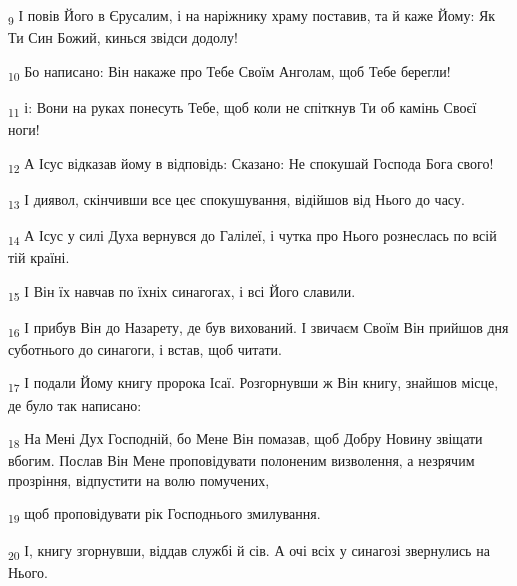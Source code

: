 \begin{tcolorbox}
\textsubscript{9} І повів Його в Єрусалим, і на наріжнику храму поставив, та й каже Йому: Як Ти Син Божий, кинься звідси додолу!
\end{tcolorbox}
\begin{tcolorbox}
\textsubscript{10} Бо написано: Він накаже про Тебе Своїм Анголам, щоб Тебе берегли!
\end{tcolorbox}
\begin{tcolorbox}
\textsubscript{11} і: Вони на руках понесуть Тебе, щоб коли не спіткнув Ти об камінь Своєї ноги!
\end{tcolorbox}
\begin{tcolorbox}
\textsubscript{12} А Ісус відказав йому в відповідь: Сказано: Не спокушай Господа Бога свого!
\end{tcolorbox}
\begin{tcolorbox}
\textsubscript{13} І диявол, скінчивши все цеє спокушування, відійшов від Нього до часу.
\end{tcolorbox}
\begin{tcolorbox}
\textsubscript{14} А Ісус у силі Духа вернувся до Галілеї, і чутка про Нього рознеслась по всій тій країні.
\end{tcolorbox}
\begin{tcolorbox}
\textsubscript{15} І Він їх навчав по їхніх синагогах, і всі Його славили.
\end{tcolorbox}
\begin{tcolorbox}
\textsubscript{16} І прибув Він до Назарету, де був вихований. І звичаєм Своїм Він прийшов дня суботнього до синагоги, і встав, щоб читати.
\end{tcolorbox}
\begin{tcolorbox}
\textsubscript{17} І подали Йому книгу пророка Ісаї. Розгорнувши ж Він книгу, знайшов місце, де було так написано:
\end{tcolorbox}
\begin{tcolorbox}
\textsubscript{18} На Мені Дух Господній, бо Мене Він помазав, щоб Добру Новину звіщати вбогим. Послав Він Мене проповідувати полоненим визволення, а незрячим прозріння, відпустити на волю помучених,
\end{tcolorbox}
\begin{tcolorbox}
\textsubscript{19} щоб проповідувати рік Господнього змилування.
\end{tcolorbox}
\begin{tcolorbox}
\textsubscript{20} І, книгу згорнувши, віддав службі й сів. А очі всіх у синагозі звернулись на Нього.
\end{tcolorbox}
